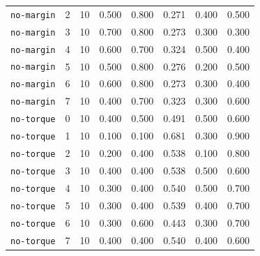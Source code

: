 \documentclass{article}
\begin{document}
\begin{center}
{\begin{tabular}{lllccccc}
\texttt{no-margin} & 2 & 10 & 0.500 & 0.800 & 0.271 & 0.400 & 0.500 \\
\texttt{no-margin} & 3 & 10 & 0.700 & 0.800 & 0.273 & 0.300 & 0.300 \\
\texttt{no-margin} & 4 & 10 & 0.600 & 0.700 & 0.324 & 0.500 & 0.400 \\
\texttt{no-margin} & 5 & 10 & 0.500 & 0.800 & 0.276 & 0.200 & 0.500 \\
\texttt{no-margin} & 6 & 10 & 0.600 & 0.800 & 0.273 & 0.300 & 0.400 \\
\texttt{no-margin} & 7 & 10 & 0.400 & 0.700 & 0.323 & 0.300 & 0.600 \\
\texttt{no-torque} & 0 & 10 & 0.400 & 0.500 & 0.491 & 0.500 & 0.600 \\
\texttt{no-torque} & 1 & 10 & 0.100 & 0.100 & 0.681 & 0.300 & 0.900 \\
\texttt{no-torque} & 2 & 10 & 0.200 & 0.400 & 0.538 & 0.100 & 0.800 \\
\texttt{no-torque} & 3 & 10 & 0.400 & 0.400 & 0.538 & 0.500 & 0.600 \\
\texttt{no-torque} & 4 & 10 & 0.300 & 0.400 & 0.540 & 0.500 & 0.700 \\
\texttt{no-torque} & 5 & 10 & 0.300 & 0.400 & 0.539 & 0.400 & 0.700 \\
\texttt{no-torque} & 6 & 10 & 0.300 & 0.600 & 0.443 & 0.300 & 0.700 \\
\texttt{no-torque} & 7 & 10 & 0.400 & 0.400 & 0.540 & 0.400 & 0.600 \\
\bottomrule
\end{tabular}%
}
\end{center}
\normalsize
\end{document}
